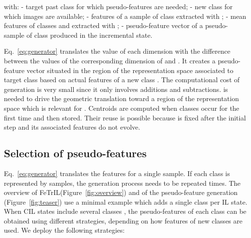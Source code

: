 \documentclass[10pt,twocolumn,letterpaper]{article}
\makeatletter
\newcommand{\ourmodel}{FeTrIL\@\xspace}
\makeatother
\begin{document}
with: 
 - target past class for which pseudo-features are needed; 
 - new class for which images  are available;
 - features of a sample  of class  extracted with ;
 - mean features of classes  and  extracted with ;
 - pseudo-feature vector of a pseudo-sample  of class  produced in the  incremental state.

Eq.~\ref{eq:generator} translates the value of each dimension with the difference between the values of the corresponding dimension of  and . 
It creates a pseudo-feature vector situated in the region of the representation space associated to target class  based on actual features of a new class .
The computational cost of generation is very small since it only involves additions and subtractions. 
 is needed to drive the geometric translation toward a region of the representation space which is relevant for .
Centroids are computed when classes occur for the first time and then stored.
Their reuse is possible because  is fixed after the initial step and its associated features do not evolve.


\subsection{Selection of pseudo-features}
\label{subsec:selection}
Eq.~\ref{eq:generator} translates the features for a single sample. 
If each class is represented by  samples, the generation process needs to be repeated  times.
The overview of \ourmodel (Figure~\ref{fig:overview}) and of the pseudo-feature generation (Figure~\ref{fig:teaser}) use a minimal example which adds a single class per IL state.
When CIL states include several classes , the  pseudo-features of each class  can be obtained using different strategies, depending on how features of new classes are used. 
We deploy the following strategies:
\end{document}
